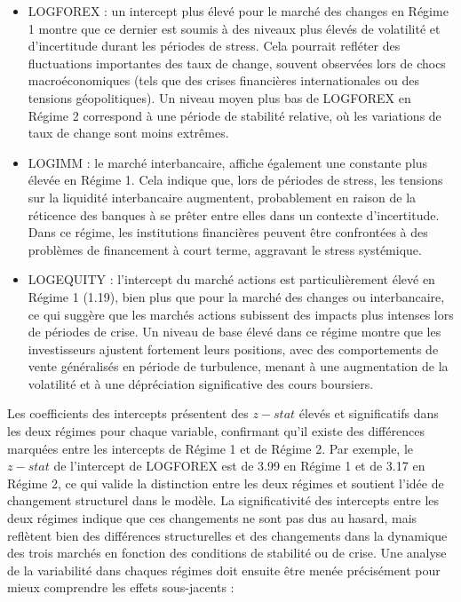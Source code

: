 \begin{itemize}
    \item LOGFOREX : un intercept plus élevé pour le marché des changes en Régime 1 montre que ce dernier est soumis à des niveaux plus élevés de volatilité et d’incertitude durant les périodes de stress. Cela pourrait refléter des fluctuations importantes des taux de change, souvent observées lors de chocs macroéconomiques (tels que des crises financières internationales ou des tensions géopolitiques). Un niveau moyen plus bas de LOGFOREX en Régime 2 correspond à une période de stabilité relative, où les variations de taux de change sont moins extrêmes.
    \item LOGIMM : le marché interbancaire, affiche également une constante plus élevée en Régime 1. Cela indique que, lors de périodes de stress, les tensions sur la liquidité interbancaire augmentent, probablement en raison de la réticence des banques à se prêter entre elles dans un contexte d'incertitude. Dans ce régime, les institutions financières peuvent être confrontées à des problèmes de financement à court terme, aggravant le stress systémique.
    \item LOGEQUITY : l’intercept du marché actions est particulièrement élevé en Régime 1 (1.19), bien plus que pour la marché des changes ou interbancaire, ce qui suggère que les marchés actions subissent des impacts plus intenses lors de périodes de crise. Un niveau de base élevé dans ce régime montre que les investisseurs ajustent fortement leurs positions, avec des comportements de vente généralisés en période de turbulence, menant à une augmentation de la volatilité et à une dépréciation significative des cours boursiers.
\end{itemize}

Les coefficients des intercepts présentent des 
$z-stat$ élevés et significatifs dans les deux régimes pour chaque variable, confirmant qu'il existe des différences marquées entre les intercepts de Régime 1 et de Régime 2. Par exemple, le $z-stat$ de l’intercept de LOGFOREX est de 3.99 en Régime 1 et de 3.17 en Régime 2, ce qui valide la distinction entre les deux régimes et soutient l’idée de changement structurel dans le modèle. La significativité des intercepts entre les deux régimes indique que ces changements ne sont pas dus au hasard, mais reflètent bien des différences structurelles et des changements dans la dynamique des trois marchés en fonction des conditions de stabilité ou de crise. Une analyse de la variabilité dans chaques régimes doit ensuite être menée précisément pour mieux comprendre les effets sous-jacents :\\

